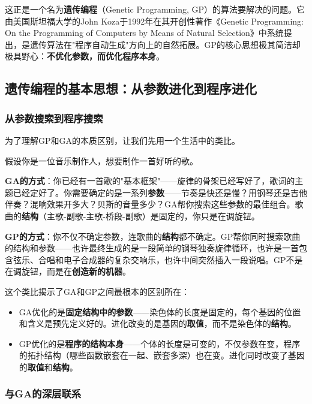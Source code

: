 \documentclass[lang=cn,zihao=-4,a4paper,fontset=windows]{beautybook}
\begin{document}
这正是一个名为\textbf{遗传编程}（Genetic Programming, GP）的算法要解决的问题。它由美国斯坦福大学的John Koza于1992年在其开创性著作《Genetic Programming: On the Programming of Computers by Means of Natural Selection》中系统提出，是遗传算法在"程序自动生成"方向上的自然拓展。GP的核心思想极其简洁却极具野心：\textbf{不优化参数，而优化程序本身}。

\subsection{遗传编程的基本思想：从参数进化到程序进化}

\subsubsection{从参数搜索到程序搜索}

为了理解GP和GA的本质区别，让我们先用一个生活中的类比。

假设你是一位音乐制作人，想要制作一首好听的歌。

\textbf{GA的方式}：你已经有一首歌的"基本框架"——旋律的骨架已经写好了，歌词的主题已经定好了。你需要确定的是一系列\textbf{参数}——节奏是快还是慢？用钢琴还是吉他伴奏？混响效果开多大？贝斯的音量多少？GA帮你搜索这些参数的最佳组合。歌曲的\textbf{结构}（主歌-副歌-主歌-桥段-副歌）是固定的，你只是在调旋钮。

\textbf{GP的方式}：你不仅不确定参数，连歌曲的\textbf{结构}都不确定。GP帮你同时搜索歌曲的结构和参数——也许最终生成的是一段简单的钢琴独奏旋律循环，也许是一首包含弦乐、合唱和电子合成器的复杂交响乐，也许中间突然插入一段说唱。GP不是在调旋钮，而是在\textbf{创造新的机器}。

这个类比揭示了GA和GP之间最根本的区别所在：

\begin{itemize}
    \item GA优化的是\textbf{固定结构中的参数}——染色体的长度是固定的，每个基因的位置和含义是预先定义好的。进化改变的是基因的\textbf{取值}，而不是染色体的\textbf{结构}。
    \item GP优化的是\textbf{程序的结构本身}——个体的长度是可变的，不仅参数在变，程序的拓扑结构（哪些函数嵌套在一起、嵌套多深）也在变。进化同时改变了基因的\textbf{取值}和\textbf{结构}。
\end{itemize}

\subsubsection{与GA的深层联系}
\end{document}
